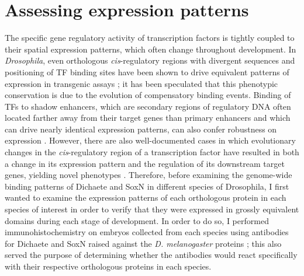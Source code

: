 \section{Assessing expression patterns}
The specific gene regulatory activity of transcription factors is tightly coupled to their spatial expression patterns, which often change throughout development. In \emph{Drosophila}, even orthologous \emph{cis}-regulatory regions with divergent sequences and positioning of TF binding sites have been shown to drive equivalent patterns of expression in transgenic assays \citep{hare_sepsid_2008}; it has been speculated that this phenotypic conservation is due to the evolution of compensatory binding events. Binding of TFs to shadow enhancers, which are secondary regions of regulatory DNA often located farther away from their target genes than primary enhancers and which can drive nearly identical expression patterns, can also confer robustness on expression \citep{ludwig_consequences_2011,perry_shadow_2010}. However, there are also well-documented cases in which evolutionary changes in the \emph{cis}-regulatory region of a transcription factor have resulted in both a change in its expression pattern and the regulation of its downstream target genes, yielding novel phenotypes \citep{arnoult_emergence_2013,frankel_conserved_2012}. Therefore, before examining the genome-wide binding patterns of Dichaete and SoxN in different species of Drosophila, I first wanted to examine the expression patterns of each orthologous protein in each species of interest in order to verify that they were expressed in grossly equivalent domains during each stage of development. In order to do so, I performed immunohistochemistry on embryos collected from each species using antibodies for Dichaete and SoxN raised against the \emph{D. melanogaster} proteins \citep{ferrero_soxneuro_2014,soriano_drosophila_1998}; this also served the purpose of determining whether the antibodies would react specifically with their respective orthologous proteins in each species.\\

